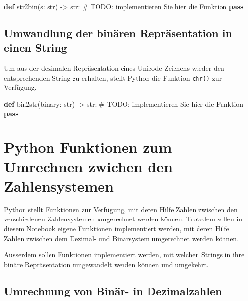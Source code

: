 \documentclass[
  nswissgerman,
  a4paper,
  DIV=11,
  numbers=noendperiod,
  ngerman]{scrreprt}
\newenvironment{Shaded}{\begin{snugshade}}{\end{snugshade}}
\newcommand{\AlertTok}[1]{\textcolor[rgb]{0.68,0.00,0.00}{#1}}
\newcommand{\BuiltInTok}[1]{\textcolor[rgb]{0.00,0.23,0.31}{#1}}
\newcommand{\CommentTok}[1]{\textcolor[rgb]{0.37,0.37,0.37}{#1}}
\newcommand{\ControlFlowTok}[1]{\textcolor[rgb]{0.00,0.23,0.31}{\textbf{#1}}}
\newcommand{\KeywordTok}[1]{\textcolor[rgb]{0.00,0.23,0.31}{\textbf{#1}}}
\newcommand{\NormalTok}[1]{\textcolor[rgb]{0.00,0.23,0.31}{#1}}
\newcommand{\OperatorTok}[1]{\textcolor[rgb]{0.37,0.37,0.37}{#1}}
\begin{document}
\begin{Shaded}
\begin{Highlighting}[numbers=left,,]
\KeywordTok{def}\NormalTok{ str2bin(s: }\BuiltInTok{str}\NormalTok{) }\OperatorTok{{-}\textgreater{}} \BuiltInTok{str}\NormalTok{:}
    \CommentTok{\# }\AlertTok{TODO}\CommentTok{: implementieren Sie hier die Funktion}
    \ControlFlowTok{pass}
\end{Highlighting}
\end{Shaded}

\section{Umwandlung der binären Repräsentation in einen
String}\label{umwandlung-der-binuxe4ren-repruxe4sentation-in-einen-string}

Um aus der dezimalen Repräsentation eines Unicode-Zeichens wieder den
entsprechenden String zu erhalten, stellt Python die Funktion
\texttt{chr()} zur Verfügung.

\begin{Shaded}
\begin{Highlighting}[numbers=left,,]
\KeywordTok{def}\NormalTok{ bin2str(binary: }\BuiltInTok{str}\NormalTok{) }\OperatorTok{{-}\textgreater{}} \BuiltInTok{str}\NormalTok{:}
    \CommentTok{\# }\AlertTok{TODO}\CommentTok{: implementieren Sie hier die Funktion}
    \ControlFlowTok{pass}
\end{Highlighting}
\end{Shaded}

\chapter{Python Funktionen zum Umrechnen zwichen den
Zahlensystemen}\label{python-funktionen-zum-umrechnen-zwichen-den-zahlensystemen-1}

Python stellt Funktionen zur Verfügung, mit deren Hilfe Zahlen zwischen
den verschiedenen Zahlensystemen umgerechnet werden können. Trotzdem
sollen in diesem Notebook eigene Funktionen implementiert werden, mit
deren Hilfe Zahlen zwischen dem Dezimal- und Binärsystem umgerechnet
werden können.

Ausserdem sollen Funktionen implementiert werden, mit welchen Strings in
ihre binäre Repräsentation umgewandelt werden können und umgekehrt.

\section{Umrechnung von Binär- in
Dezimalzahlen}\label{umrechnung-von-binuxe4r--in-dezimalzahlen-1}
\end{document}

